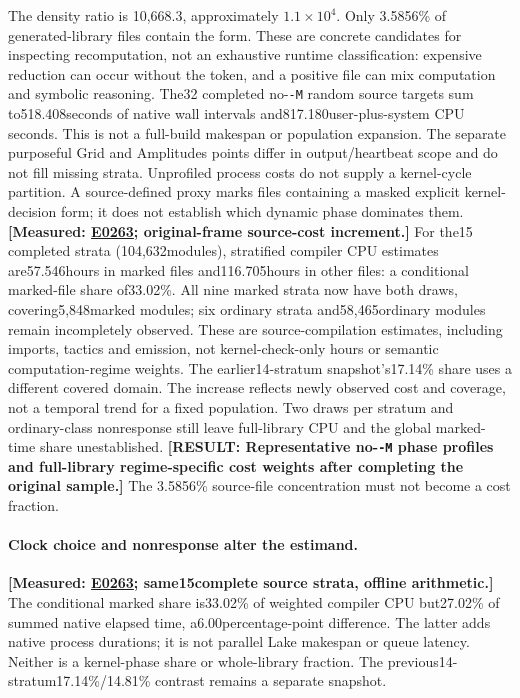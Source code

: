 \documentclass[10pt,twocolumn]{article}
\newcommand{\missing}[1]{\textbf{[RESULT: #1]}}
\newcommand{\measured}[1]{\textbf{[Measured: #1]}}
\newcommand{\expref}[2]{\href{https://github.com/yunwei37/proofserve/blob/main/docs/tmp/build-and-evaluate/step-#1/step-report.md}{E#2}}
\begin{document}
The density ratio is 10,668.3, approximately $1.1\times10^4$.
Only 3.5856\% of generated-library files contain the form.
These are concrete candidates for inspecting recomputation, not an exhaustive
runtime classification: expensive reduction can occur without the token,
and a positive file can mix computation and symbolic reasoning.
The32 completed no-\texttt{-M} random source targets sum to518.408seconds
of native wall intervals and817.180user-plus-system CPU seconds.
This is not a full-build makespan or population expansion.
The separate purposeful Grid and Amplitudes points differ in output/heartbeat
scope and do not fill missing strata.
Unprofiled process costs do not supply a kernel-cycle partition.
A source-defined proxy marks files containing a masked explicit kernel-decision
form; it does not establish which dynamic phase dominates them.
\measured{\expref{0263-20261102T040256+0000}{0263}; original-frame source-cost increment.}
For the15 completed strata (104,632modules), stratified compiler CPU estimates
are57.546hours in marked files and116.705hours in other files:
a conditional marked-file share of33.02\%.
All nine marked strata now have both draws, covering5,848marked modules;
six ordinary strata and58,465ordinary modules remain incompletely observed.
These are source-compilation estimates, including imports, tactics and emission,
not kernel-check-only hours or semantic computation-regime weights.
The earlier14-stratum snapshot's17.14\% share uses a different covered domain.
The increase reflects newly observed cost and coverage, not a temporal trend
for a fixed population. Two draws per stratum and ordinary-class nonresponse
still leave full-library CPU and the global marked-time share unestablished.
\missing{Representative no-\texttt{-M} phase profiles and full-library
regime-specific cost weights after completing the original sample.}
The 3.5856\% source-file concentration must not become a cost fraction.

\paragraph{Clock choice and nonresponse alter the estimand.}
\measured{\expref{0263-20261102T040256+0000}{0263}; same15complete source strata, offline arithmetic.}
The conditional marked share is33.02\% of weighted compiler CPU but27.02\%
of summed native elapsed time, a6.00percentage-point difference.
The latter adds native process durations; it is not parallel Lake makespan
or queue latency. Neither is a kernel-phase share or whole-library fraction.
The previous14-stratum17.14\%/14.81\% contrast remains a separate snapshot.
\end{document}
